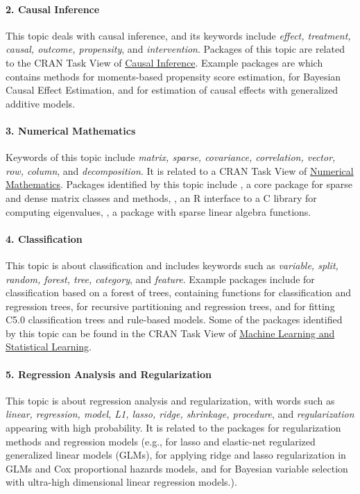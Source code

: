 \paragraph{2. Causal Inference} This topic deals with causal inference, and its keywords include {\it effect, treatment, causal, outcome, propensity}, and {\it intervention}. Packages of this topic are related to the CRAN Task View of \href{https://cran.r-project.org/web/views/CausalInference.html}{Causal Inference}. Example packages are  which contains methods for moments-based propensity score estimation,  for Bayesian Causal Effect Estimation, and  for estimation of causal effects with generalized additive models. 


\paragraph{3. Numerical Mathematics} Keywords of this topic include {\it matrix, sparse, covariance, correlation, vector, row, column}, and {\it decomposition}. It is related to a CRAN Task View of \href{https://cran.r-project.org/web/views/NumericalMathematics.html}{Numerical Mathematics}. Packages identified by this topic include , a core package for sparse and dense matrix classes and methods, , an R interface to a C library for computing eigenvalues, , a package with sparse linear algebra functions.


\paragraph{4. Classification} This topic is about classification and includes keywords such as {\it variable, split, random, forest, tree, category}, and {\it feature}. Example packages include  for classification based on a forest of trees,  containing functions for classification and regression trees,  for recursive partitioning and regression trees, and  for fitting C5.0 classification trees and rule-based models. Some of the packages identified by this topic can be found in the CRAN Task View of \href{https://cran.r-project.org/web/views/MachineLearning.html}{Machine Learning and Statistical Learning}.

 

\paragraph{5. Regression Analysis and Regularization} This topic is about regression analysis and regularization, with words such as {\it linear, regression, model, L1, lasso, ridge, shrinkage, procedure}, and {\it regularization} appearing with high probability. It is related to the packages for regularization methods and regression models (e.g.,  for lasso and elastic-net regularized generalized linear models (GLMs),  for applying ridge and lasso regularization in GLMs and Cox proportional hazards models, and  for Bayesian variable selection with ultra-high dimensional linear regression models.). 



